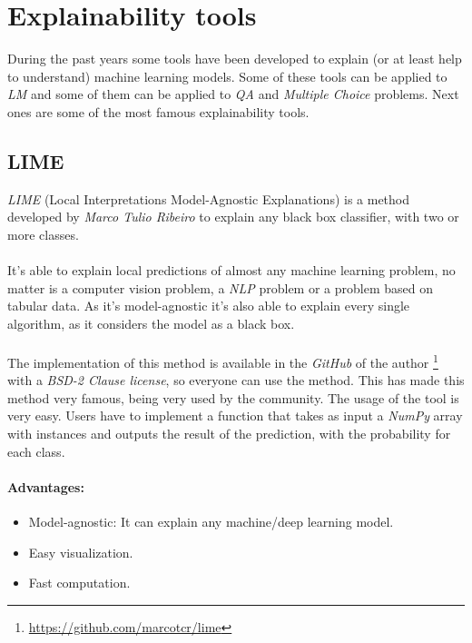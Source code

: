 \section{Explainability tools}
\label{sec:tools}
\noindent During the past years some tools have been developed to explain (or at least help to understand) machine learning models. Some of these tools can be applied to \emph{LM} and some of them can be applied to \emph{QA} and \emph{Multiple Choice} problems. Next ones are some of the most famous explainability tools.
\subsection{LIME}
\label{sec:Lime}
\noindent \emph{LIME} (Local Interpretations Model-Agnostic Explanations) is a method developed by \emph{Marco Tulio Ribeiro} to explain any black box classifier, with two or more classes.
\paragraph{}
It's able to explain local predictions of almost any machine learning problem, no matter is a computer vision problem, a \emph{NLP} problem or a problem based on tabular data. As it's model-agnostic it's also able to explain every single algorithm, as it considers the model as a black box. 
\paragraph{}
The implementation of this method is available in the \emph{GitHub} of the author \footnote{\url{https://github.com/marcotcr/lime}} with a \emph{BSD-2 Clause license}, so everyone can use the method. This has made this method very famous, being very used by the community. 
The usage of the tool is very easy. Users have to implement a function that takes as input a \emph{NumPy} array with instances and outputs the result of the prediction, with the probability for each class.
 
\paragraph{Advantages:}
\begin{itemize}
	\item Model-agnostic: It can explain any machine/deep learning model.
	\item Easy visualization.
	\item Fast computation.
\end{itemize}
